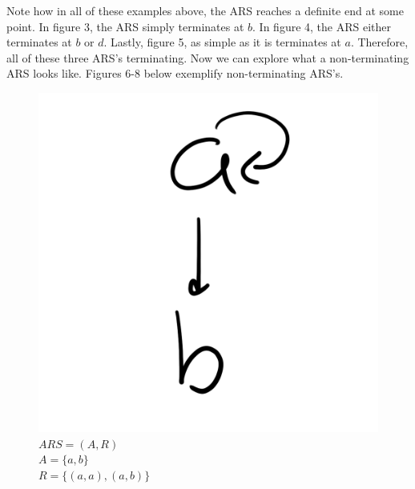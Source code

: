 \documentclass{article}
\begin{document}
\medskip\noindent
Note how in all of these examples above, the ARS reaches a definite end at some point. In figure 3, the ARS simply terminates at $b$. In figure 4, the ARS either terminates at $b$ or $d$. Lastly, figure 5, as simple as it is terminates at $a$. Therefore, all of these three ARS's terminating. Now we can explore what a non-terminating ARS looks like. Figures 6-8 below exemplify non-terminating ARS's.

\begin{figure}[H]
  \centering
  \includegraphics[scale=0.06]{gen6}
  \caption[] {
    $ARS = (A, R)$
    \\ $A=\{a, b\}$
    \\ $R=\{(a, a), (a, b)\}$
    \endtabular}
\end{figure}
\end{document}
